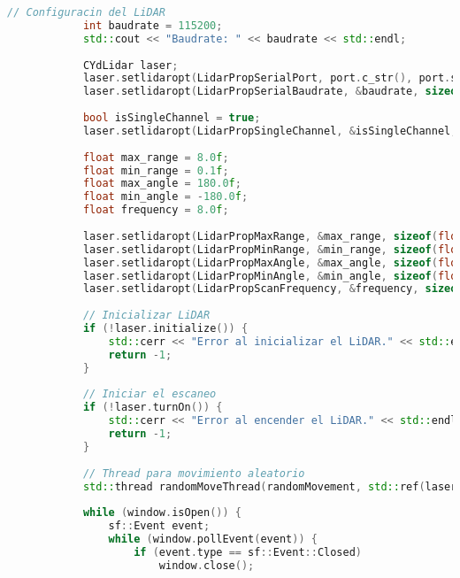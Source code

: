 \begin{lstlisting}[language={C++}, caption={Primer ajuste de c\'odigo}, label={Script}]
            // Configuracin del LiDAR
            int baudrate = 115200;
            std::cout << "Baudrate: " << baudrate << std::endl;
        
            CYdLidar laser;
            laser.setlidaropt(LidarPropSerialPort, port.c_str(), port.size());
            laser.setlidaropt(LidarPropSerialBaudrate, &baudrate, sizeof(int));
        
            bool isSingleChannel = true;
            laser.setlidaropt(LidarPropSingleChannel, &isSingleChannel, sizeof(bool));
        
            float max_range = 8.0f;
            float min_range = 0.1f;
            float max_angle = 180.0f;
            float min_angle = -180.0f;
            float frequency = 8.0f;
        
            laser.setlidaropt(LidarPropMaxRange, &max_range, sizeof(float));
            laser.setlidaropt(LidarPropMinRange, &min_range, sizeof(float));
            laser.setlidaropt(LidarPropMaxAngle, &max_angle, sizeof(float));
            laser.setlidaropt(LidarPropMinAngle, &min_angle, sizeof(float));
            laser.setlidaropt(LidarPropScanFrequency, &frequency, sizeof(float));
        
            // Inicializar LiDAR
            if (!laser.initialize()) {
                std::cerr << "Error al inicializar el LiDAR." << std::endl;
                return -1;
            }
        
            // Iniciar el escaneo
            if (!laser.turnOn()) {
                std::cerr << "Error al encender el LiDAR." << std::endl;
                return -1;
            }
        
            // Thread para movimiento aleatorio
            std::thread randomMoveThread(randomMovement, std::ref(laser));
        
            while (window.isOpen()) {
                sf::Event event;
                while (window.pollEvent(event)) {
                    if (event.type == sf::Event::Closed)
                        window.close();
        

\end{lstlisting}
